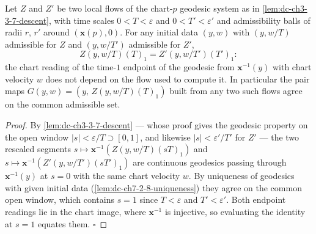 \begin{lemma}
  \label{lem:dc-ch3-3-7-flow-agree}
  \leanok
  Let $Z$ and $Z'$ be two local flows of the chart-$p$ geodesic system as in
  \cref{lem:dc-ch3-3-7-descent}, with time scales $0<T<\varepsilon$ and
  $0<T'<\varepsilon'$ and admissibility balls of radii $r$, $r'$ around
  $(\mathbf{x}(p),0)$. For any initial data $(y,w)$ with $(y,w/T)$ admissible
  for $Z$ and $(y,w/T')$ admissible for $Z'$,
  $$Z(y,w/T)(T)_1=Z'(y,w/T')(T')_1:$$
  the chart reading of the time-$1$ endpoint of the geodesic from
  $\mathbf{x}^{-1}(y)$ with chart velocity $w$ does not depend on the flow
  used to compute it. In particular the pair maps
  $G(y,w)=(y,\,Z(y,w/T)(T)_1)$ built from any two such flows agree on the
  common admissible set.
\end{lemma}
\begin{proof}
  \leanok
  By \cref{lem:dc-ch3-3-7-descent} — whose proof gives the geodesic property
  on the open window $|s|<\varepsilon/T\supset[0,1]$, and likewise
  $|s|<\varepsilon'/T'$ for $Z'$ — the two rescaled segments
  $s\mapsto\mathbf{x}^{-1}(Z(y,w/T)(sT)_1)$ and
  $s\mapsto\mathbf{x}^{-1}(Z'(y,w/T')(sT')_1)$ are continuous geodesics
  passing through $\mathbf{x}^{-1}(y)$ at $s=0$ with the same chart velocity
  $w$. By uniqueness of geodesics with given initial data
  (\cref{lem:dc-ch7-2-8-uniqueness}) they agree on the common open window,
  which contains $s=1$ since $T<\varepsilon$ and $T'<\varepsilon'$. Both
  endpoint readings lie in the chart image, where $\mathbf{x}^{-1}$ is
  injective, so evaluating the identity at $s=1$ equates them. $\square$
\end{proof}

